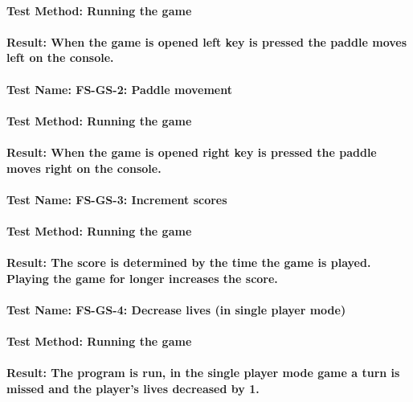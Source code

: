 \documentclass[12pt, titlepage]{article}
\begin{document}
\paragraph {Test Method: Running the game}
\paragraph {Result: When the game is opened left key is pressed the paddle moves left on the console.}

\paragraph {Test Name: FS-GS-2: Paddle movement}
\paragraph {Test Method: Running the game}
\paragraph {Result: When the game is opened right key is pressed the paddle moves right on the console.}

\paragraph {Test Name: FS-GS-3: Increment scores}
\paragraph {Test Method: Running the game}
\paragraph {Result: The score is determined by the time the game is played. Playing the game for longer increases the score.}

\paragraph {Test Name: FS-GS-4: Decrease lives (in single player mode)}
\paragraph {Test Method: Running the game}
\paragraph {Result: The program is run, in the single player mode game a turn is missed and the player’s lives decreased by 1.}
\end{document}

